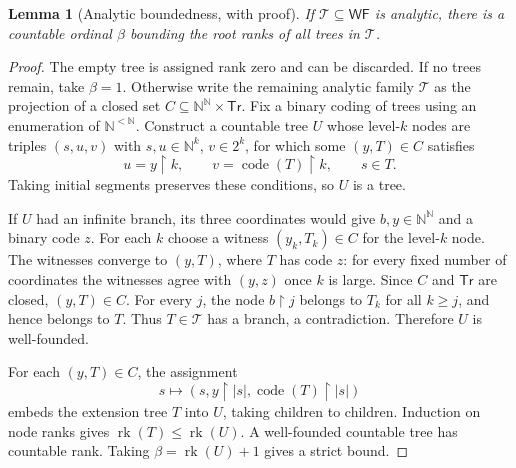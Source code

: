 \documentclass[11pt]{article}
\numberwithin{equation}{section}
\newtheorem{lemma}[lemma]{Lemma}
\theoremstyle{definition}
\theoremstyle{remark}
\newcommand{\N}{\mathbb N}
\newcommand{\WF}{\mathsf{WF}}
\newcommand{\Tr}{\mathsf{Tr}}
\newcommand{\rk}{\operatorname{rk}}
\begin{document}
\begin{lemma}[Analytic boundedness, with proof]
\label{pma:bor:lem:boundedtrees}
If $\mathcal T\subseteq\WF$ is analytic, there is a countable ordinal
$\beta$ bounding the root ranks of all trees in $\mathcal T$.
\end{lemma}
\begin{proof}
The empty tree is assigned rank zero and can be discarded. If no trees remain,
take $\beta=1$. Otherwise write the remaining analytic family $\mathcal T$ as the projection
of a closed set $C\subseteq\N^\N\times\Tr$. Fix a binary coding of trees
using an enumeration of $\N^{<\N}$.
Construct a countable tree $U$ whose level-$k$ nodes are triples
$(s,u,v)$ with $s,u\in\N^k$, $v\in2^k$, for which some $(y,T)\in C$
satisfies
\[
 u=y\upharpoonright k,\qquad
 v=\operatorname{code}(T)\upharpoonright k,\qquad s\in T.
\]
Taking initial segments preserves these conditions, so $U$ is a tree.

If $U$ had an infinite branch, its three coordinates would give
$b,y\in\N^\N$ and a binary code $z$. For each $k$ choose a witness
$(y_k,T_k)\in C$ for the level-$k$ node. The witnesses converge to $(y,T)$,
where $T$ has code $z$: for every fixed number of coordinates the witnesses
agree with $(y,z)$ once $k$ is large. Since $C$ and $\Tr$ are closed,
$(y,T)\in C$. For every $j$, the node $b\upharpoonright j$ belongs to $T_k$
for all $k\geq j$, and hence belongs to $T$. Thus $T\in\mathcal T$ has a
branch, a contradiction. Therefore $U$ is well-founded.

For each $(y,T)\in C$, the assignment
\[
 s\longmapsto
 (s,y\upharpoonright |s|,\operatorname{code}(T)\upharpoonright |s|)
\]
embeds the extension tree $T$ into $U$, taking children to children. Induction
on node ranks gives $\rk(T)\leq\rk(U)$. A well-founded countable tree has
countable rank. Taking $\beta=\rk(U)+1$ gives a strict bound.
\end{proof}
\end{document}
